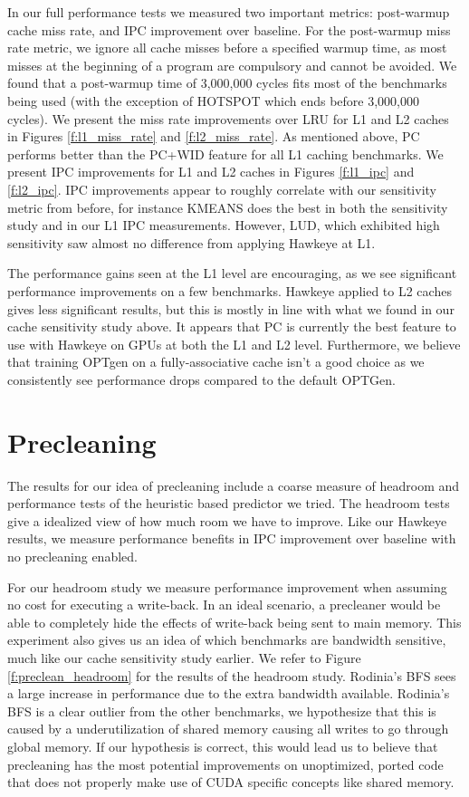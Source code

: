 In our full performance tests we measured two important metrics: post-warmup cache miss rate, and IPC improvement over baseline. For the post-warmup miss rate metric, we ignore all cache misses before a specified warmup time, as most misses at the beginning of a program are compulsory and cannot be avoided. We found that a post-warmup time of 3,000,000 cycles fits most of the benchmarks being used (with the exception of HOTSPOT which ends before 3,000,000 cycles). We present the miss rate improvements over LRU for L1 and L2 caches in Figures \ref{f:l1_miss_rate} and \ref{f:l2_miss_rate}. As mentioned above, PC performs better than the PC+WID feature for all L1 caching benchmarks. We present IPC improvements for L1 and L2 caches in Figures \ref{f:l1_ipc} and \ref{f:l2_ipc}. IPC improvements appear to roughly correlate with our sensitivity metric from before, for instance KMEANS does the best in both the sensitivity study and in our L1 IPC measurements. However, LUD, which exhibited high sensitivity saw almost no difference from applying Hawkeye at L1.

The performance gains seen at the L1 level are encouraging, as we see significant performance improvements on a few benchmarks. Hawkeye applied to L2 caches gives less significant results, but this is mostly in line with what we found in our cache sensitivity study above. It appears that PC is currently the best feature to use with Hawkeye on GPUs at both the L1 and L2 level. Furthermore, we believe that training OPTgen on a fully-associative cache isn't a good choice as we consistently see performance drops compared to the default OPTGen.

\section{Precleaning}

The results for our idea of precleaning include a coarse measure of headroom and performance tests of the heuristic based predictor we tried. The headroom tests give a idealized view of how much room we have to improve. Like our Hawkeye results, we measure performance benefits in IPC improvement over baseline with no precleaning enabled.

For our headroom study we measure performance improvement when assuming no cost for executing a write-back. In an ideal scenario, a precleaner would be able to completely hide the effects of write-back being sent to main memory. This experiment also gives us an idea of which benchmarks are bandwidth sensitive, much like our cache sensitivity study earlier. We refer to Figure \ref{f:preclean_headroom} for the results of the headroom study. Rodinia's BFS sees a large increase in performance due to the extra bandwidth available. Rodinia's BFS is a clear outlier from the other benchmarks, we hypothesize that this is caused by a underutilization of shared memory causing all writes to go through global memory. If our hypothesis is correct, this would lead us to believe that precleaning has the most potential improvements on unoptimized, ported code that does not properly make use of CUDA specific concepts like shared memory.

